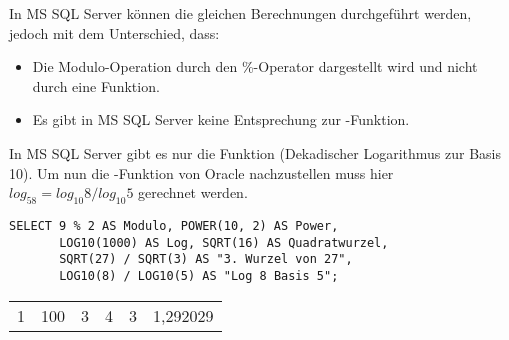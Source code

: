         In MS SQL Server können die gleichen Berechnungen durchgeführt
        werden, jedoch mit dem Unterschied, dass:
        \begin{itemize}
          \item Die Modulo-Operation durch den \%-Operator dargestellt wird und
          nicht durch eine Funktion.
          \item Es gibt in MS SQL Server keine Entsprechung zur
          -Funktion.
        \end{itemize}
        In MS SQL Server gibt es nur die Funktion 
        (Dekadischer Logarithmus zur Basis 10). Um nun die
        -Funktion von Oracle nachzustellen muss hier $log_58
        = log_{10}8 / log_{10}5$ gerechnet werden.
        \begin{lstlisting}[language=ms_sql,caption={Höhere Rechenarten in MS SQL Server},label=sql03_18]
SELECT 9 % 2 AS Modulo, POWER(10, 2) AS Power,
       LOG10(1000) AS Log, SQRT(16) AS Quadratwurzel,
       SQRT(27) / SQRT(3) AS "3. Wurzel von 27",
       LOG10(8) / LOG10(5) AS "Log 8 Basis 5";
        \end{lstlisting}
        \begin{center}
          \begin{small}
            \tablehead{}
            \begin{mssql}
              \begin{supertabular}{llllll}
                1 & 100 & 3 & 4 & 3 & 1,292029 \\
              \end{supertabular}
            \end{mssql}
          \end{small}
        \end{center}
